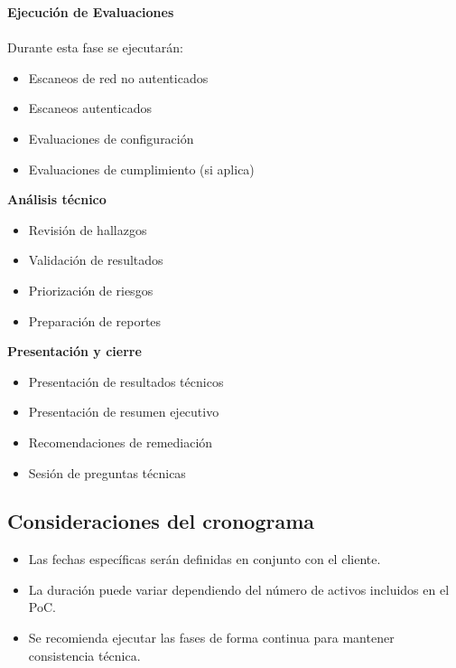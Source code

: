 \documentclass[a4paper]{article}
\begin{document}
    \newpage

    \textbf{Ejecución de Evaluaciones}\\\\
    Durante esta fase se ejecutarán:
    \begin{itemize}
        \item Escaneos de red no autenticados
        \item Escaneos autenticados
        \item Evaluaciones de configuración
        \item Evaluaciones de cumplimiento (si aplica)
    \end{itemize}

    \textbf{Análisis técnico}\\
    \begin{itemize}
        \item Revisión de hallazgos
        \item Validación de resultados
        \item Priorización de riesgos
        \item Preparación de reportes
    \end{itemize}

        \textbf{Presentación y cierre}\\
    \begin{itemize}
        \item Presentación de resultados técnicos
        \item Presentación de resumen ejecutivo
        \item Recomendaciones de remediación
        \item Sesión de preguntas técnicas
    \end{itemize}

    \subsection{Consideraciones del cronograma}
    \begin{itemize}
        \item Las fechas específicas serán definidas en conjunto con el cliente.
        \item La duración puede variar dependiendo del número de activos incluidos en el PoC.
        \item Se recomienda ejecutar las fases de forma continua para mantener consistencia técnica.
    \end{itemize}
\end{document}
